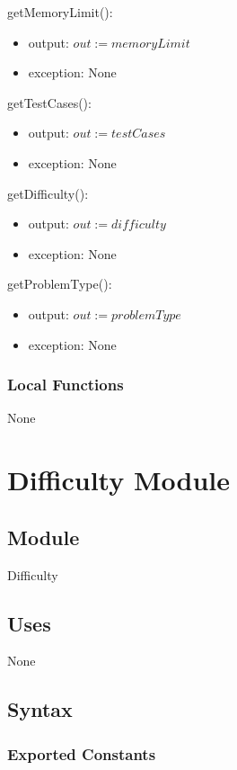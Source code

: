 \documentclass[12pt, titlepage]{article}
\begin{document}
\noindent getMemoryLimit():
\begin{itemize}
\item output: $out := memoryLimit$
\item exception: None
\end{itemize}

\noindent getTestCases():
\begin{itemize}
\item output: $out := testCases$
\item exception: None
\end{itemize}

\noindent getDifficulty():
\begin{itemize}
\item output: $out := difficulty$
\item exception: None
\end{itemize}

\noindent getProblemType():
\begin{itemize}
\item output: $out := problemType$
\item exception: None
\end{itemize}

\subsubsection{Local Functions}
None



\newpage

\section{Difficulty Module} \label{Difficulty} 

\subsection{Module}

Difficulty

\subsection{Uses}

None


\subsection{Syntax}

\subsubsection{Exported Constants}
\end{document}
